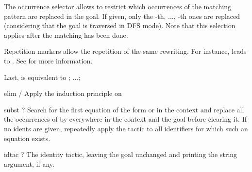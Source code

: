 {  \smallskip
  
  The occurrence selector  allows to restrict which occurrences
  of the matching pattern are replaced in the goal. If given, only the
  -th, ..., -th ones are replaced (considering that the goal is
  traversed in DFS mode). Note that this selection applies after the matching has
  been done.
  
  \medskip
  
  Repetition markers allow the repetition of the same rewriting. For instance,
  \tacname{}  leads to  \tacname{} . See  for
  more information.
  
  \medskip

  Last, \tacname{}  is equivalent to
  \tacname{} ; ...; \tacname{} }

\addAuto
{elim}
{$\!\!$/ }
{Apply the induction principle  on }

\addAuto
{subst}
{?}
{Search for the first equation of the form  or  in the context
 and replace all the occurrences of  by  everywhere in the context and the
 goal before clearing it. If no idents are given, repeatedly apply the tactic to
 all identifiers for which such an equation exists.}



\addOther
{idtac}
{?}
{The identity tactic, leaving the goal unchanged and printing the string argument, if any.}
